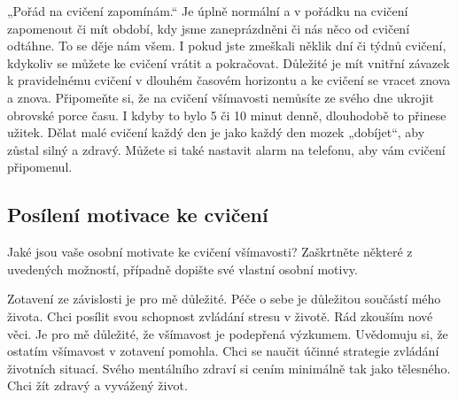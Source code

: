 {\begin{description*}
		\item[„Pořád na cvičení zapomínám.“] Je úplně normální a v pořádku na cvičení zapomenout či mít období, kdy jsme zaneprázdněni či nás něco od cvičení odtáhne. To se děje nám všem. I pokud jste zmeškali něklik dní či týdnů cvičení, kdykoliv se můžete ke cvičení vrátit a pokračovat. Důležité je mít vnitřní závazek k pravidelnému cvičení v dlouhém časovém horizontu a ke cvičení se vracet znova a znova. Připomeňte si, že na cvičení všímavosti nemůsíte ze svého dne ukrojit obrovské porce času. I kdyby to bylo 5 či 10 minut denně, dlouhodobě to přinese užitek. Dělat malé cvičení každý den je jako každý den mozek „dobíjet“, aby zůstal silný a zdravý. Můžete si také nastavit alarm na telefonu, aby vám cvičení připomenul.
	\end{description*}
	}
\subsection{Posílení motivace ke cvičení \normalPencilLeftDown}
	Jaké jsou vaše osobní motivate ke cvičení všímavosti? Zaškrtněte některé z uvedených možností, případně dopište své vlastní osobní motivy.


	\begin{itemize}
		\itemSq Zotavení ze závislosti je pro mě důležité.
		\itemSq Péče o sebe je důležitou součástí mého života.
		\itemSq Chci posílit svou schopnost zvládání stresu v životě.
		\itemSq Rád zkouším nové věci.
		\itemSq Je pro mě důležité, že všímavost je podepřená výzkumem.
		\itemSq Uvědomuju si, že ostatím všímavost v zotavení pomohla.
		\itemSq Chci se naučit účinné strategie zvládání životních situací.
		\itemSq Svého mentálního zdraví si cením minimálně tak jako tělesného.
		\itemSq Chci žít zdravý a vyvážený život.
		\itemSq {}
		\itemSq {}
		\itemSq {}
	\end{itemize}

